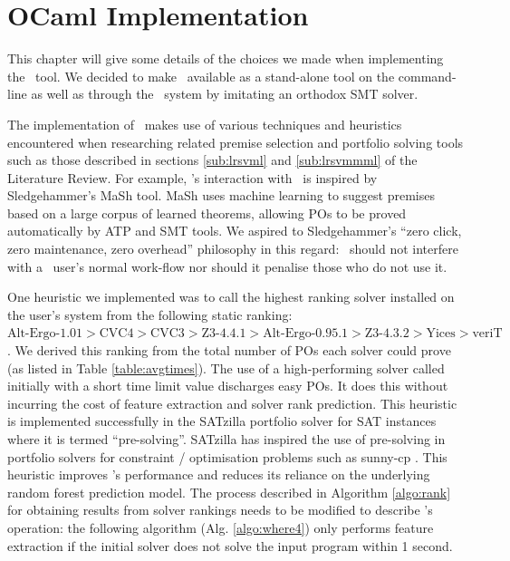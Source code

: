 \chapter{OCaml Implementation}
\thispagestyle{nohead}
\label{Implementation}

This chapter will give some details of the choices we made when implementing the \where~tool.
We decided to make \where~available as a stand-alone tool on the command-line as well as through the \why~system by imitating an orthodox SMT solver.   

The implementation of \where~makes use of various techniques and heuristics encountered when researching related premise selection and portfolio solving tools such as those described in sections \ref{sub:lrsvml} and \ref{sub:lrsvmmml} of the Literature Review.   
For example, \where's interaction with \why~is inspired by Sledgehammer's MaSh \cite{Sledgehammer} tool. MaSh uses machine learning to suggest premises based on a large corpus of learned theorems, allowing POs to be proved automatically by ATP and SMT tools. 
We aspired to Sledgehammer's ``zero click, zero maintenance, zero overhead'' philosophy in this regard: \where~should not interfere with a \why~user's normal work-flow nor should it penalise those who do not use it.

One heuristic we implemented was to call the highest ranking solver installed on the user's system from the following static ranking:
$ \text{Alt-Ergo-1.01} > \text{CVC4} > \text{CVC3} > \text{Z3-4.4.1} > \text{Alt-Ergo-0.95.1} > \text{Z3-4.3.2} > \text{Yices} > \text{veriT} $.
We derived this ranking from the total number of POs each solver could prove (as listed in Table \ref{table:avgtimes}).
The use of a high-performing solver called initially with a short time limit value discharges easy POs.
It does this without incurring the cost of feature extraction and solver rank prediction.
This heuristic is implemented successfully in the SATzilla  \cite{SATzilla2012} portfolio solver for SAT instances where it is termed ``pre-solving''.
SATzilla has inspired the use of pre-solving in portfolio solvers for constraint / optimisation problems such as sunny-cp \cite{sunny-cp}.
This heuristic improves \where's performance and reduces its reliance on the underlying random forest prediction model. 
The process described in Algorithm \ref{algo:rank} for obtaining results from solver rankings needs to be modified to describe \where's operation:
the following algorithm (Alg. \ref{algo:where4}) only performs feature extraction if the initial solver does not solve the input program within 1 second. 

